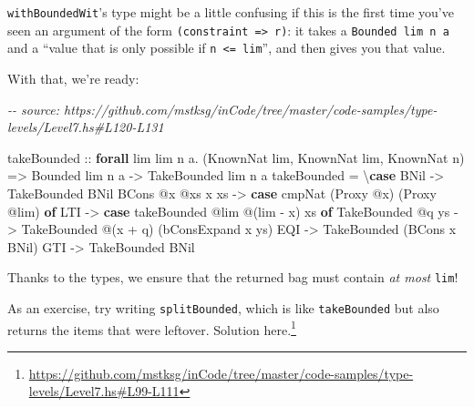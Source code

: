 \documentclass[]{article}
\newenvironment{Shaded}{}{}
\newcommand{\CommentTok}[1]{\textcolor[rgb]{0.38,0.63,0.69}{\textit{#1}}}
\newcommand{\DataTypeTok}[1]{\textcolor[rgb]{0.56,0.13,0.00}{#1}}
\newcommand{\KeywordTok}[1]{\textcolor[rgb]{0.00,0.44,0.13}{\textbf{#1}}}
\newcommand{\NormalTok}[1]{#1}
\newcommand{\OperatorTok}[1]{\textcolor[rgb]{0.40,0.40,0.40}{#1}}
\newcommand{\OtherTok}[1]{\textcolor[rgb]{0.00,0.44,0.13}{#1}}
\renewcommand{\href}[2]{#2\footnote{\url{#1}}}
\begin{document}
\texttt{withBoundedWit}'s type might be a little confusing if this is the first
time you've seen an argument of the form
\texttt{(constraint\ =\textgreater{}\ r)}: it takes a
\texttt{Bounded\ lim\ n\ a} and a ``value that is only possible if
\texttt{n\ \textless{}=\ lim}'', and then gives you that value.

With that, we're ready:

\begin{Shaded}
\begin{Highlighting}[]
\CommentTok{{-}{-} source: https://github.com/mstksg/inCode/tree/master/code{-}samples/type{-}levels/Level7.hs\#L120{-}L131}

\OtherTok{takeBounded ::}
  \KeywordTok{forall}\NormalTok{ lim lim\textquotesingle{} n a}\OperatorTok{.}
\NormalTok{  (}\DataTypeTok{KnownNat}\NormalTok{ lim, }\DataTypeTok{KnownNat}\NormalTok{ lim\textquotesingle{}, }\DataTypeTok{KnownNat}\NormalTok{ n) }\OtherTok{=\textgreater{}}
  \DataTypeTok{Bounded}\NormalTok{ lim n a }\OtherTok{{-}\textgreater{}}
  \DataTypeTok{TakeBounded}\NormalTok{ lim\textquotesingle{} n a}
\NormalTok{takeBounded }\OtherTok{=}\NormalTok{ \textbackslash{}}\KeywordTok{case}
  \DataTypeTok{BNil} \OtherTok{{-}\textgreater{}} \DataTypeTok{TakeBounded} \DataTypeTok{BNil}
  \DataTypeTok{BCons} \OperatorTok{@}\NormalTok{x }\OperatorTok{@}\NormalTok{xs x xs }\OtherTok{{-}\textgreater{}} \KeywordTok{case}\NormalTok{ cmpNat (}\DataTypeTok{Proxy} \OperatorTok{@}\NormalTok{x) (}\DataTypeTok{Proxy} \OperatorTok{@}\NormalTok{lim\textquotesingle{}) }\KeywordTok{of}
    \DataTypeTok{LTI} \OtherTok{{-}\textgreater{}} \KeywordTok{case}\NormalTok{ takeBounded }\OperatorTok{@}\NormalTok{lim }\OperatorTok{@}\NormalTok{(lim\textquotesingle{} }\OperatorTok{{-}}\NormalTok{ x) xs }\KeywordTok{of}
      \DataTypeTok{TakeBounded} \OperatorTok{@}\NormalTok{q ys }\OtherTok{{-}\textgreater{}} \DataTypeTok{TakeBounded} \OperatorTok{@}\NormalTok{(x }\OperatorTok{+}\NormalTok{ q) (bConsExpand x ys)}
    \DataTypeTok{EQI} \OtherTok{{-}\textgreater{}} \DataTypeTok{TakeBounded}\NormalTok{ (}\DataTypeTok{BCons}\NormalTok{ x }\DataTypeTok{BNil}\NormalTok{)}
    \DataTypeTok{GTI} \OtherTok{{-}\textgreater{}} \DataTypeTok{TakeBounded} \DataTypeTok{BNil}
\end{Highlighting}
\end{Shaded}

Thanks to the types, we ensure that the returned bag must contain \emph{at most}
\texttt{lim\textquotesingle{}}!

As an exercise, try writing \texttt{splitBounded}, which is like
\texttt{takeBounded} but also returns the items that were leftover.
\href{https://github.com/mstksg/inCode/tree/master/code-samples/type-levels/Level7.hs\#L99-L111}{Solution
here.}
\end{document}
